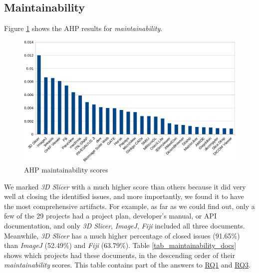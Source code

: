 \documentclass[3p, 12pt,authoryear]{elsarticle}
\begin{document}
\subsection{Maintainability} \label{sec_score_maintainability}

Figure \ref{fg_maintainability_scores} shows the AHP results for
\textit{maintainability}. 

\begin{figure}[ht]
\includegraphics[scale=0.38]{figures/maintainability_scores.png}
\caption{AHP maintainability scores}
\label{fg_maintainability_scores}
\end{figure}

We marked \textit{3D Slicer} with a much higher score than others because it did
very well at closing the identified issues, and more importantly, we found it to
have the most comprehensive artifacts. For example, as far as we could find out,
only a few of the 29 projects had a project plan, developer's manual, or API
documentation, and only \textit{3D Slicer}, \textit{ImageJ}, \textit{Fiji}
included all three documents. Meanwhile, \textit{3D Slicer} has a much higher
percentage of closed issues (91.65\%) than \textit{ImageJ} (52.49\%) and
\textit{Fiji} (63.79\%). Table \ref{tab_maintainability_docs} shows which
projects had these documents, in the descending order of their
\textit{maintainability} scores. This table contains part of the answers to
\hyperlink{rq1}{RQ1} and \hyperlink{rq3}{RQ3}.
\end{document}
